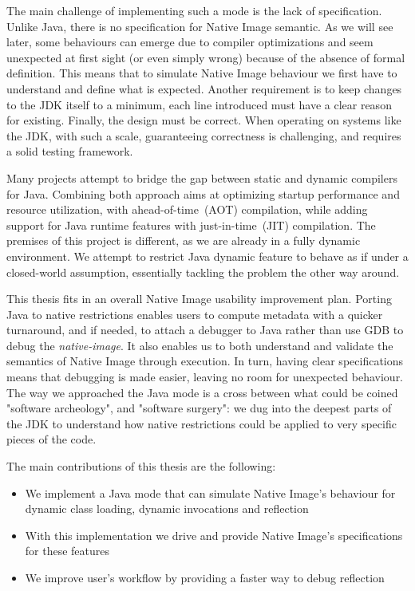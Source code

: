 The main challenge of implementing such a mode is the lack of specification. Unlike Java, there is no specification for Native Image semantic. As we will see later, some behaviours can emerge due to compiler optimizations and seem unexpected at first sight (or even simply wrong) because of the absence of formal definition.
This means that to simulate Native Image behaviour we first have to understand and define what is expected.
Another requirement is to keep changes to the JDK itself to a minimum, each line introduced must have a clear reason for existing.
Finally, the design must be correct. When operating on systems like the JDK, with such a scale, guaranteeing correctness is challenging, and requires a solid testing framework.

Many projects attempt to bridge the gap between static and dynamic compilers for Java. Combining both approach aims at optimizing startup performance and resource utilization, with ahead-of-time~(AOT) compilation, while adding support for Java runtime features with just-in-time~(JIT) compilation.
The premises of this project is different, as we are already in a fully dynamic environment. We attempt to restrict Java dynamic feature to behave as if under a closed-world assumption, essentially tackling the problem the other way around.

This thesis fits in an overall Native Image usability improvement plan.
Porting Java to native restrictions enables users to compute metadata with a quicker turnaround, and if needed, to attach a debugger to Java rather than use GDB to debug the \textit{native-image}. It also enables us to both understand and validate the semantics of Native Image through execution. In turn, having clear specifications means that debugging is made easier, leaving no room for unexpected behaviour.
The way we approached the Java mode is a cross between what could be coined "software archeology", and 
"software surgery": we dug into the deepest parts of the JDK to understand how native restrictions could be applied to very specific pieces of the code.

The main contributions of this thesis are the following:
\begin{itemize}
  \item We implement a Java mode that can simulate Native Image's behaviour for dynamic class loading, dynamic invocations and reflection
  \item With this implementation we drive and provide Native Image's specifications for these features
  \item We improve user's workflow by providing a faster way to debug reflection
\end{itemize}

